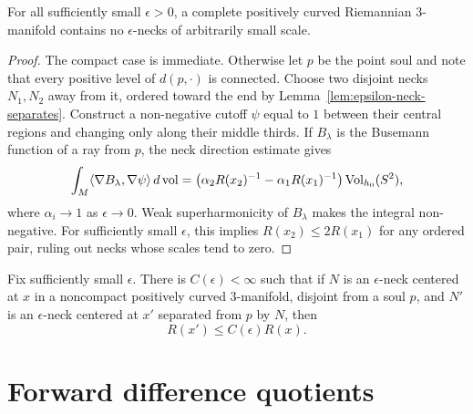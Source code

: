 \begin{proposition}
\label{prop:epsilon-neck-narrow}
\label{narrows}

For all sufficiently small $\epsilon>0$, a complete positively curved
Riemannian $3$-manifold contains no $\epsilon$-necks of arbitrarily
small scale.
\end{proposition}
\begin{proof}
\sketch

The compact case is immediate. Otherwise let $p$ be the point soul and
note that every positive level of $d(p,\cdot)$ is connected. Choose two
disjoint necks $N_1,N_2$ away from it, ordered toward the
end by Lemma~\ref{lem:epsilon-neck-separates}. Construct a non-negative
cutoff $\psi$ equal to $1$ between their central regions and changing
only along their middle thirds. If $B_\lambda$ is the Busemann function
of a ray from $p$, the neck direction estimate gives
$$\int_M\langle\nabla B_\lambda,\nabla\psi\rangle\,d\operatorname{vol}
=\bigl(\alpha_2R(x_2)^{-1}-\alpha_1R(x_1)^{-1}\bigr)
\operatorname{Vol}_{h_0}(S^2),$$
where $\alpha_i\to1$ as $\epsilon\to0$. Weak superharmonicity of
$B_\lambda$ makes the integral non-negative. For sufficiently small
$\epsilon$, this implies $R(x_2)\le2R(x_1)$ for any ordered pair, ruling
out necks whose scales tend to zero.
\end{proof}

\begin{corollary}
\label{cor:epsilon-neck-scale-bound}
\label{strnarrows}

Fix sufficiently small $\epsilon$. There is $C(\epsilon)<\infty$ such
that if $N$ is an $\epsilon$-neck centered at $x$ in a noncompact
positively curved $3$-manifold, disjoint from a soul $p$, and $N'$ is
an $\epsilon$-neck centered at $x'$ separated from $p$ by $N$, then
$$R(x')\le C(\epsilon)R(x).$$
\end{corollary}

\section{Forward difference quotients}

